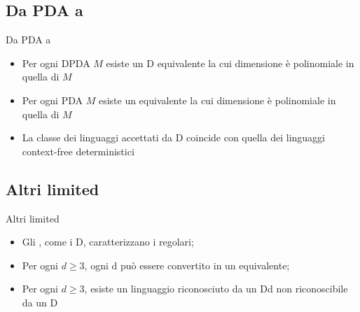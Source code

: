 \documentclass{beamer}
\begin{document}
\subsection{Da PDA a \texorpdfstring{}{2-LA}}
\begin{frame}{Da PDA a }
	\begin{theor}
		\begin{itemize}
			\item Per ogni DPDA $M$ esiste un D equivalente la cui dimensione è polinomiale in quella di $M$
			\item Per ogni PDA $M$ esiste un  equivalente la cui dimensione è polinomiale in quella di $M$
			\item La classe dei linguaggi accettati da D coincide con quella dei linguaggi context-free deterministici
		\end{itemize}
	\end{theor}
\end{frame}


\subsection{Altri limited}
\begin{frame}{Altri limited}
	\begin{theor}
		\begin{itemize}
			\item Gli \la1, come i D, caratterizzano i regolari;
			\item Per ogni $d\ge3$, ogni \la d può essere convertito in un  equivalente;
			\item Per ogni $d\ge3$, esiste un linguaggio riconosciuto da un D\la d non riconoscibile da un D\la{(d-1)}
		\end{itemize}
	\end{theor}
\end{frame}
\end{document}
